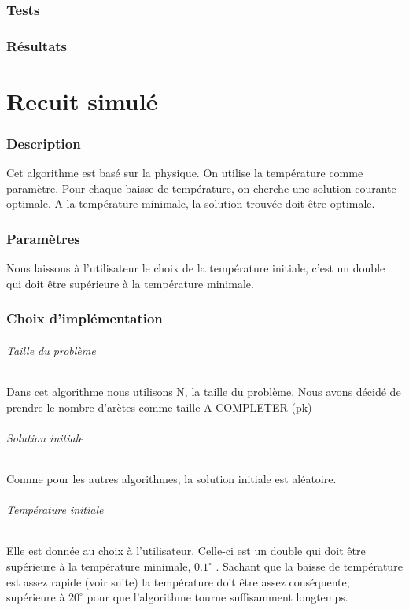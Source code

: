 \documentclass[12pt]{article}
\begin{document}
\section{Tests}
\section{Résultats}

\newpage

\part{Recuit simulé}

\section{Description}
Cet algorithme est basé sur la physique. On utilise la température comme paramètre. Pour chaque baisse de température, on cherche une solution courante optimale. A la température minimale, la solution trouvée doit être optimale.

\section{Paramètres}
Nous laissons à l’utilisateur le choix de la température initiale, c’est un double qui doit être supérieure à la température minimale.

\section{Choix d'implémentation}

\paragraph{Taille du problème}
Dans cet algorithme nous utilisons N, la taille du problème. Nous avons décidé de prendre le nombre d’arètes comme taille  A COMPLETER (pk)

\paragraph{Solution initiale} Comme pour les autres algorithmes, la solution initiale est aléatoire.

\paragraph{Température initiale} Elle est donnée au choix à l’utilisateur. Celle-ci est un double qui doit être supérieure à la température minimale, $0.1^\circ$ . Sachant que la baisse de température est assez rapide (voir suite) la température doit être assez conséquente, supérieure à $20^\circ$ pour que l’algorithme tourne suffisamment longtemps.
\end{document}

